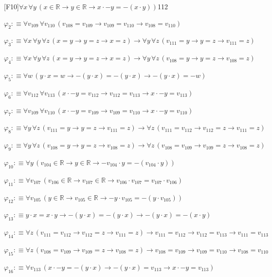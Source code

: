 \begin{fullproof}{[F10]}{$\forall x\,\forall y\,(x \in \mathbb{R} \to y \in \mathbb{R} \to x \cdot -y = -(x \cdot y))$}{112}
\begin{abbrevlist}
\item $\varphi_{2} :\equiv \forall v_{109}\,\forall v_{110}\,(v_{108} = v_{109} \to v_{109} = v_{110} \to v_{108} = v_{110})$
\item $\varphi_{3} :\equiv \forall x\,\forall y\,\forall z\,(x = y \to y = z \to x = z) \to \forall y\,\forall z\,(v_{111} = y \to y = z \to v_{111} = z)$
\item $\varphi_{4} :\equiv \forall x\,\forall y\,\forall z\,(x = y \to y = z \to x = z) \to \forall y\,\forall z\,(v_{108} = y \to y = z \to v_{108} = z)$
\item $\varphi_{5} :\equiv \forall w\,(y \cdot x = w \to -(y \cdot x) = -(y \cdot x) \to -(y \cdot x) = -w)$
\item $\varphi_{6} :\equiv \forall v_{112}\,\forall v_{113}\,(x \cdot -y = v_{112} \to v_{112} = v_{113} \to x \cdot -y = v_{113})$
\item $\varphi_{7} :\equiv \forall v_{109}\,\forall v_{110}\,(x \cdot -y = v_{109} \to v_{109} = v_{110} \to x \cdot -y = v_{110})$
\item $\varphi_{8} :\equiv \forall y\,\forall z\,(v_{111} = y \to y = z \to v_{111} = z) \to \forall z\,(v_{111} = v_{112} \to v_{112} = z \to v_{111} = z)$
\item $\varphi_{9} :\equiv \forall y\,\forall z\,(v_{108} = y \to y = z \to v_{108} = z) \to \forall z\,(v_{108} = v_{109} \to v_{109} = z \to v_{108} = z)$
\item $\varphi_{10} :\equiv \forall y\,(v_{104} \in \mathbb{R} \to y \in \mathbb{R} \to -v_{104} \cdot y = -(v_{104} \cdot y))$
\item $\varphi_{11} :\equiv \forall v_{107}\,(v_{106} \in \mathbb{R} \to v_{107} \in \mathbb{R} \to v_{106} \cdot v_{107} = v_{107} \cdot v_{106})$
\item $\varphi_{12} :\equiv \forall v_{105}\,(y \in \mathbb{R} \to v_{105} \in \mathbb{R} \to -y \cdot v_{105} = -(y \cdot v_{105}))$
\item $\varphi_{13} :\equiv y \cdot x = x \cdot y \to -(y \cdot x) = -(y \cdot x) \to -(y \cdot x) = -(x \cdot y)$
\item $\varphi_{14} :\equiv \forall z\,(v_{111} = v_{112} \to v_{112} = z \to v_{111} = z) \to v_{111} = v_{112} \to v_{112} = v_{113} \to v_{111} = v_{113}$
\item $\varphi_{15} :\equiv \forall z\,(v_{108} = v_{109} \to v_{109} = z \to v_{108} = z) \to v_{108} = v_{109} \to v_{109} = v_{110} \to v_{108} = v_{110}$
\item $\varphi_{16} :\equiv \forall v_{113}\,(x \cdot -y = -(y \cdot x) \to -(y \cdot x) = v_{113} \to x \cdot -y = v_{113})$

\end{abbrevlist}
\end{fullproof}
